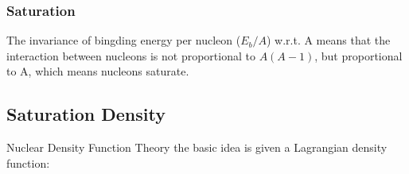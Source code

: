 \subsubsection{Saturation}
The invariance of bingding energy per nucleon ($E_b/A$) w.r.t. A means that
the interaction between nucleons is not proportional to $A(A-1)$, but proportional
to A, which means nucleons saturate.
\subsection{Saturation Density}
Nuclear Density Function Theory
the basic idea is given a Lagrangian density function:
